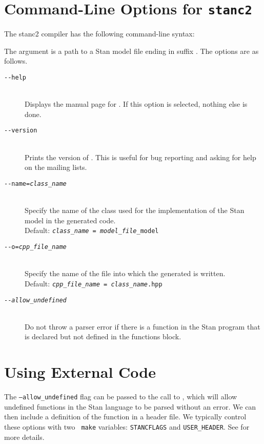 \section{Command-Line Options for {\tt\bfseries stanc2}}

The stanc2 compiler has the following command-line syntax:
%
\begin{quote}
\end{quote}
%
The argument  is a path to a Stan model
file ending in suffix .  The options are as follows.
%
\begin{description}
%
\item[\tt {-}-help] 
\mbox{ } \\ 
Displays the manual page for \stanc.  If this option is selected,
nothing else is done.
%
\item[\tt {-}-version]
\mbox{ } \\ 
Prints the version of \stanc.  This is useful for bug reporting
and asking for help on the mailing lists.
%
\item[\tt {-}-name={\slshape class\_name}]
\mbox{ } \\ 
Specify the name of the class used for the implementation of the
Stan model in the generated \Cpp code.  
\\[2pt]
Default: {\tt {\slshape class\_name = model\_file}\_model}
%
\item[\tt {-}-o={\slshape cpp\_file\_name}]
\mbox{ } \\ 
Specify the name of the file into which the generated \Cpp is written.
\\[2pt]
Default: {\tt {\slshape cpp\_file\_name} = {\slshape class\_name}.hpp}
%
\item[\tt {-}-{\slshape allow\_undefined}]
\mbox{ } \\ 
Do not throw a parser error if there is a function in the Stan program
that is declared but not defined in the functions block.
%
\end{description}

\section{Using External \Cpp Code}

The {\tt --allow\_undefined} flag can be passed to the call to \stanc,
which will allow undefined functions in the Stan language to be parsed
without an error. We can then include a definition of the function in
a \Cpp header file. We typically control these options with two {\tt
  make} variables: \Verb|STANCFLAGS| and \Verb|USER_HEADER|. See
 for more details.

